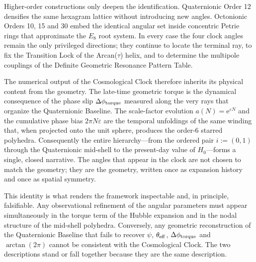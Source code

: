 Higher-order constructions only deepen the identification. Quaternionic Order 12 densifies the same hexagram lattice without introducing new angles. Octonionic Orders 10, 15 and 30 embed the identical angular set inside concentric Petrie rings that approximate the \(E_8\) root system. In every case the four clock angles remain the only privileged directions; they continue to locate the terminal ray, to fix the Transition Lock of the Arcan(\(\tau\)) helix, and to determine the multipole couplings of the Definite Geometric Resonance Pattern Table.

The numerical output of the Cosmological Clock therefore inherits its physical content from the geometry. The late-time geometric torque is the dynamical consequence of the phase slip \(\Delta\phi_{\rm torque}\) measured along the very rays that organize the Quaternionic Baseline. The scale-factor evolution \(a(N)=\mathrm{e}^{\varepsilon N}\) and the cumulative phase bias \(2\pi N\varepsilon\) are the temporal unfoldings of the same winding that, when projected onto the unit sphere, produces the order-6 starred polyhedra. Consequently the entire hierarchy—from the ordered pair \(i:=(0,1)\) through the Quaternionic mid-shell to the present-day value of \(H_0\)—forms a single, closed narrative. The angles that appear in the clock are not chosen to match the geometry; they are the geometry, written once as expansion history and once as spatial symmetry.

This identity is what renders the framework inspectable and, in principle, falsifiable. Any observational refinement of the angular parameters must appear simultaneously in the torque term of the Hubble expansion and in the nodal structure of the mid-shell polyhedra. Conversely, any geometric reconstruction of the Quaternionic Baseline that fails to recover \(\psi\), \(\theta_{\rm eff}\), \(\Delta\phi_{\rm torque}\) and \(\arctan(2\pi)\) cannot be consistent with the Cosmological Clock. The two descriptions stand or fall together because they are the same description.
